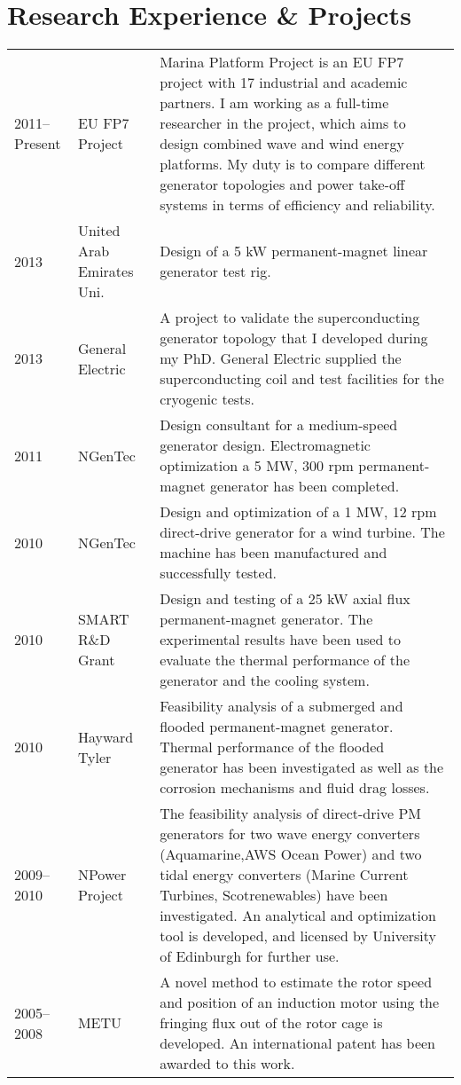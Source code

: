 \documentclass[a4paper,12pt]{article}
\begin{document}
\section{Research Experience \& Projects}
\begin{longtable}{lp{3cm}p{12cm}}
2011--Present & EU FP7 Project & Marina Platform Project is an EU FP7 project with 17 industrial and academic partners. I am working as a full-time researcher in the project, which aims to design combined wave and wind energy platforms. My duty is to compare different generator topologies and power take-off systems in terms of efficiency and reliability.\\
2013 & United Arab Emirates Uni. & Design of a 5 kW permanent-magnet linear generator test rig.\\
2013 & General Electric & A project to validate the superconducting generator topology that I developed during my PhD. General Electric supplied the superconducting coil and test facilities for the cryogenic tests.\\
2011 & NGenTec & Design consultant for a medium-speed generator design. Electromagnetic optimization a 5 MW, 300 rpm permanent-magnet generator has been completed.\\
2010 & NGenTec & Design and optimization of a 1 MW, 12 rpm direct-drive generator for a wind turbine. The machine has been manufactured and successfully tested.\\
2010 & SMART R\&D Grant & Design and testing of a 25 kW axial flux permanent-magnet generator. The experimental results have been used to evaluate the thermal performance of the generator and the cooling system.\\
2010 & Hayward Tyler & Feasibility analysis of a
submerged and flooded permanent-magnet generator. Thermal performance of the flooded generator has been
investigated as well as the corrosion mechanisms and fluid drag losses.\\
2009--2010 & NPower Project & The feasibility analysis of direct-drive PM generators for two wave energy converters (Aquamarine,AWS Ocean Power) and two tidal energy converters (Marine Current Turbines, Scotrenewables) have been investigated. An analytical and optimization tool is developed, and licensed by University of Edinburgh for further use.\\
2005--2008 & METU & A novel method to estimate the rotor speed and position of an induction motor using the fringing flux out
of the rotor cage is developed. An international patent has been awarded to this work.\\
\end{longtable}
\end{document}
